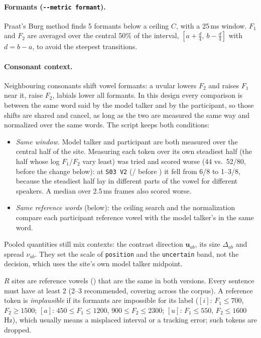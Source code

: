 \documentclass[11pt]{article}
\begin{document}
\paragraph{Formants (\texttt{-{}-metric formant}).} Praat's Burg method finds 5 formants below a ceiling $C$, with a 25\,ms window. $F_1$ and $F_2$ are averaged over the central 50\% of the interval, $[a + \tfrac{d}{4},\ b - \tfrac{d}{4}]$ with $d=b-a$, to avoid the steepest transitions.

\paragraph{Consonant context.} Neighbouring consonants shift vowel formants: a uvular  lowers $F_2$ and raises $F_1$ near it,  raise $F_2$, labials lower all formants. In this design every comparison is between the same word said by the model talker and by the participant, so those shifts are shared and cancel, as long as the two are measured the same way and normalized over the same words. The script keeps both conditions:
\begin{itemize}[leftmargin=*]
\item \emph{Same window.} Model talker and participant are both measured over the central half of the site. Measuring each token over its own steadiest half (the half whose log $F_1$/$F_2$ vary least) was tried and scored worse (44 vs.\ 52/80, before the change below): at \texttt{S03 V2} (\textipa{[KO]}/\textipa{[Ko]} before \textipa{[zj]}) it fell from 6/8 to 1--3/8, because the steadiest half lay in different parts of the vowel for different speakers. A median over 2.5\,ms frames also scored worse.
\item \emph{Same reference words} (below): the ceiling search and the normalization compare each participant reference vowel with the model talker's in the same word.
\end{itemize}
Pooled quantities still mix contexts: the contrast direction $\mathbf u_{ab}$, its size $\Delta_{ab}$ and spread $\nu_{ab}$. They set the scale of \texttt{position} and the \texttt{uncertain} band, not the decision, which uses the site's own model talker midpoint.

$R$ sites are reference vowels (\textipa{[i a u]}) that are the same in both versions. Every sentence must have at least 2 (2--3 recommended, covering \textipa{[a i u]} across the corpus). A reference token is \emph{implausible} if its formants are impossible for its label ($[i]$: $F_1 \le 700$, $F_2 \ge 1500$; $[a]$: $450 \le F_1 \le 1200$, $900 \le F_2 \le 2300$; $[u]$: $F_1 \le 550$, $F_2 \le 1600$\,Hz), which usually means a misplaced interval or a tracking error; such tokens are dropped.
\end{document}
